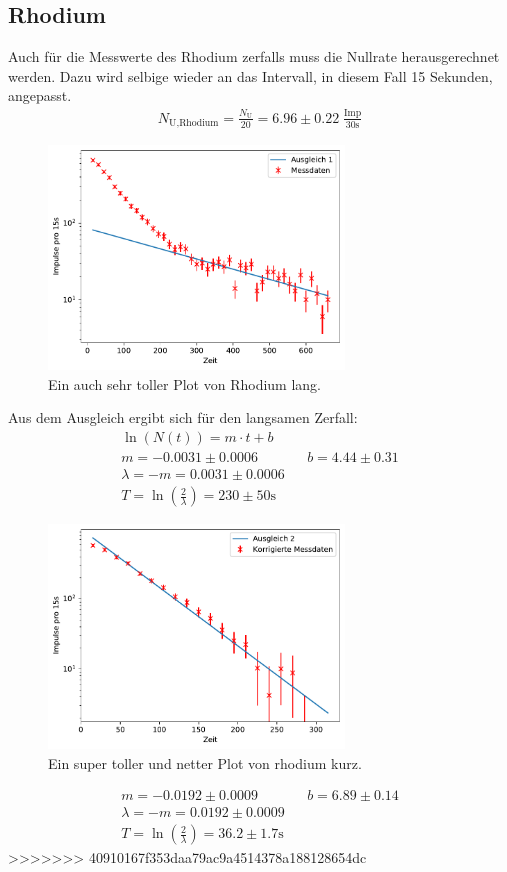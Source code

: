\subsection{Rhodium}
Auch für die Messwerte des Rhodium zerfalls muss die Nullrate herausgerechnet werden.
Dazu wird selbige wieder an das Intervall, in diesem Fall 15 Sekunden, angepasst.
\begin{align*}
    N_{\text{U},\text{Rhodium}} =  \frac{N_{\text{U}}}{20} = 6.96 \pm 0.22 \; \frac{\text{Imp}}{30\text{s}}
\end{align*}
\begin{figure}
    \centering
    \includegraphics[width=0.7\textwidth]{plots/Rhodium_lang.pdf}
    \caption{Ein auch sehr toller Plot von Rhodium lang.}
\end{figure}
Aus dem Ausgleich ergibt sich für den langsamen Zerfall:
\begin{align*}
    \ln(N(t)) = m \cdot t + b\\
     m = -0.0031 \pm 0.0006 && b = 4.44 \pm 0.31 \\
    \lambda = -m = 0.0031 \pm 0.0006 \\
    T = \ln\left( \frac{2}{\lambda} \right) =  230 \pm 50 \text{s}
\end{align*}
\begin{figure}
    \centering
    \includegraphics[width=0.7\textwidth]{plots/Rhodium_kurz.pdf}
    \caption{Ein super toller und netter Plot von rhodium kurz.}
\end{figure}
\begin{align*}
     m = -0.0192 \pm 0.0009 && b = 6.89 \pm 0.14 \\
    \lambda = -m = 0.0192 \pm 0.0009 \\
    T = \ln\left( \frac{2}{\lambda} \right) = 36.2 \pm 1.7 \text{s}
\end{align*}
>>>>>>> 40910167f353daa79ac9a4514378a188128654dc
